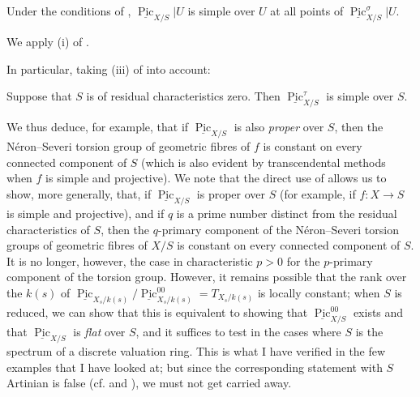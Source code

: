 \begin{corollary}\label{fga3.vi-3-corollary-3.8}
    Under the conditions of , $\underline{\operatorname{Pic}}_{X/S}|U$ is simple over $U$ at all points of $\underline{\operatorname{Pic}}_{X/S}^\sigma|U$.
\end{corollary}

\begin{cproof}
    We apply (i) of .
\end{cproof}


In particular, taking (iii) of  into account:


\begin{corollary}\label{fga3.vi-3-corollary-3.9}
    Suppose that $S$ is of residual characteristics zero.
    Then $\underline{\operatorname{Pic}}_{X/S}^\tau$ is simple over $S$.
\end{corollary}

\begin{remark}\label{fga3.vi-3-remark-3.10}
    We thus deduce, for example, that if $\underline{\operatorname{Pic}}_{X/S}$ is also \emph{proper} over $S$, then the Néron–Severi torsion group of geometric fibres of $f$ is constant on every connected component of $S$ (which is also evident by transcendental methods when $f$ is simple and projective).
    We note that the direct use of  allows us to show, more generally, that, if $\underline{\operatorname{Pic}}_{X/S}$ is proper over $S$ (for example, if $f\colon X\to S$ is simple and projective), and if $q$ is a prime number distinct from the residual characteristics of $S$, then the $q$-primary component of the Néron–Severi torsion groups of geometric fibres of $X/S$ is constant on every connected component of $S$.
    It is no longer, however, the case in characteristic $p>0$ for the $p$-primary component of the torsion group.
    However, it remains possible that the rank over the $k(s)$ of $\underline{\operatorname{Pic}}_{X_s/k(s)}/\underline{\operatorname{Pic}}_{X_s/k(s)}^{00}=T_{X_s/k(s)}$ is locally constant;
    when $S$ is reduced, we  can show that this is equivalent to showing that $\underline{\operatorname{Pic}}_{X/S}^{00}$ exists and that $\underline{\operatorname{Pic}}_{X/S}$ is \emph{flat} over $S$, and it suffices to test in the cases where $S$ is the spectrum of a discrete valuation ring.
    This is what I have verified in the few examples that I have looked at;
    but since the corresponding statement with $S$ Artinian is false (cf.  and ), we must not get carried away.
\end{remark}